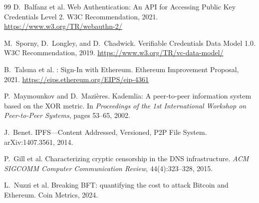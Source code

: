 \documentclass[11pt,a4paper]{article}
\begin{document}
\begin{thebibliography}{99}
D.~Balfanz et al.
\newblock Web Authentication: An API for Accessing Public Key Credentials Level 2.
\newblock W3C Recommendation, 2021. \url{https://www.w3.org/TR/webauthn-2/}

M.~Sporny, D.~Longley, and D.~Chadwick.
\newblock Verifiable Credentials Data Model 1.0.
\newblock W3C Recommendation, 2019. \url{https://www.w3.org/TR/vc-data-model/}

B.~Talsma et al.
: Sign-In with Ethereum.
\newblock Ethereum Improvement Proposal, 2021. \url{https://eips.ethereum.org/EIPS/eip-4361}

P.~Maymounkov and D.~Mazi\`eres.
\newblock Kademlia: A peer-to-peer information system based on the XOR metric.
\newblock In \textit{Proceedings of the 1st International Workshop on Peer-to-Peer Systems}, pages 53--65, 2002.

J.~Benet.
\newblock IPFS---Content Addressed, Versioned, P2P File System.
\newblock arXiv:1407.3561, 2014.

P.~Gill et al.
\newblock Characterizing cryptic censorship in the DNS infrastructure.
\newblock \textit{ACM SIGCOMM Computer Communication Review}, 44(4):323--328, 2015.

L.~Nuzzi et al.
\newblock Breaking BFT: quantifying the cost to attack Bitcoin and Ethereum.
\newblock Coin Metrics, 2024.

\end{thebibliography}
\end{document}

